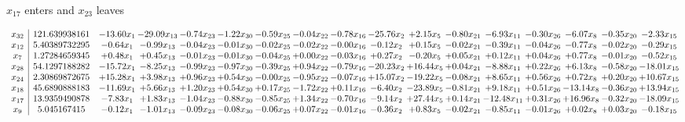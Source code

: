 \documentclass[9pt]{article}
\begin{document}
 $ x_{17} $ enters and $ x_{23} $ leaves 

 \[\begin{array}{c| c c@{\hskip 2pt} c@{\hskip 2pt} c@{\hskip 2pt} c@{\hskip 2pt} c@{\hskip 2pt} c@{\hskip 2pt} c@{\hskip 2pt} c@{\hskip 2pt} c@{\hskip 2pt} c@{\hskip 2pt} c@{\hskip 2pt} c@{\hskip 2pt} c@{\hskip 2pt} c@{\hskip 2pt} c@{\hskip 2pt} }
 x_{32}   &  121.639938161 & -13.60 x_{1} & -29.09 x_{13} & -0.74 x_{23} & -1.22 x_{30} & -0.59 x_{25} & -0.04 x_{22} & -0.78 x_{16} & -25.76 x_{2} & +  2.15 x_{5} & -0.80 x_{21} & -6.93 x_{11} & -0.30 x_{26} & -6.07 x_{8} & -0.35 x_{20} & -2.33 x_{15}\\
 x_{12}   &  5.40389732295 & -0.64 x_{1} & -0.99 x_{13} & -0.04 x_{23} & -0.01 x_{30} & -0.02 x_{25} & -0.02 x_{22} & -0.00 x_{16} & -0.12 x_{2} & +  0.15 x_{5} & -0.02 x_{21} & -0.39 x_{11} & -0.04 x_{26} & -0.77 x_{8} & -0.02 x_{20} & -0.29 x_{15}\\
 x_{7}   &  1.27284659345 & +  0.48 x_{1} & +  0.45 x_{13} & -0.01 x_{23} & -0.01 x_{30} & -0.04 x_{25} & +  0.00 x_{22} & -0.03 x_{16} & +  0.27 x_{2} & -0.20 x_{5} & +  0.05 x_{21} & +  0.12 x_{11} & +  0.04 x_{26} & +  0.77 x_{8} & -0.01 x_{20} & -0.52 x_{15}\\
 x_{28}   &  54.1297188282 & -15.72 x_{1} & -8.25 x_{13} & -0.99 x_{23} & -0.97 x_{30} & -0.39 x_{25} & +  0.94 x_{22} & -0.79 x_{16} & -20.23 x_{2} & + 16.44 x_{5} & +  0.04 x_{21} & -8.88 x_{11} & +  0.22 x_{26} & +  6.13 x_{8} & -0.58 x_{20} & -18.01 x_{15}\\
 x_{24}   &  2.30869872675 & + 15.28 x_{1} & +  3.98 x_{13} & +  0.96 x_{23} & +  0.54 x_{30} & -0.00 x_{25} & -0.95 x_{22} & -0.07 x_{16} & + 15.07 x_{2} & -19.22 x_{5} & -0.08 x_{21} & +  8.65 x_{11} & +  0.56 x_{26} & +  0.72 x_{8} & +  0.20 x_{20} & + 10.67 x_{15}\\
 x_{18}   &  45.6890888183 & -11.69 x_{1} & +  5.66 x_{13} & +  1.20 x_{23} & +  0.54 x_{30} & +  0.17 x_{25} & -1.72 x_{22} & +  0.11 x_{16} & -6.40 x_{2} & -23.89 x_{5} & -0.81 x_{21} & +  9.18 x_{11} & +  0.51 x_{26} & -13.14 x_{8} & -0.36 x_{20} & + 13.94 x_{15}\\
 x_{17}   &  13.9359490878 & -7.83 x_{1} & +  1.83 x_{13} & -1.04 x_{23} & -0.88 x_{30} & -0.85 x_{25} & +  1.34 x_{22} & -0.70 x_{16} & -9.14 x_{2} & + 27.44 x_{5} & +  0.14 x_{21} & -12.48 x_{11} & +  0.31 x_{26} & + 16.96 x_{8} & -0.32 x_{20} & -18.09 x_{15}\\
 x_{9}   &  5.045167415 & -0.12 x_{1} & -1.01 x_{13} & -0.09 x_{23} & -0.08 x_{30} & -0.06 x_{25} & +  0.07 x_{22} & -0.01 x_{16} & -0.36 x_{2} & +  0.83 x_{5} & -0.02 x_{21} & -0.85 x_{11} & -0.01 x_{26} & +  0.02 x_{8} & +  0.03 x_{20} & -0.18 x_{15}\\

\end{array}\]
\end{document}
